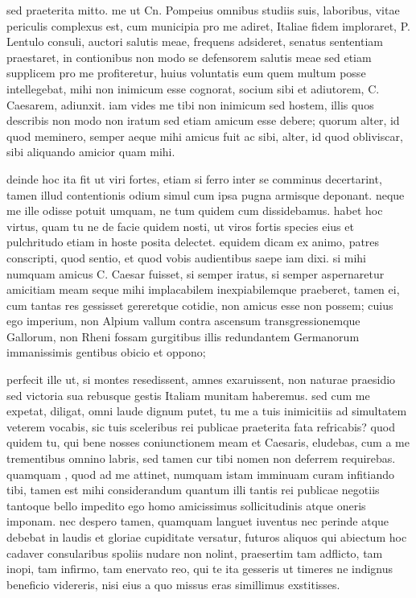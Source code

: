  sed praeterita mitto. me ut Cn. Pompeius omnibus studiis suis, laboribus, vitae periculis complexus est, cum municipia pro me adiret, Italiae fidem imploraret, P. Lentulo consuli, auctori salutis meae, frequens adsideret, senatus sententiam praestaret, in contionibus non modo se defensorem salutis meae sed etiam supplicem pro me profiteretur, huius voluntatis eum quem multum posse intellegebat, mihi non inimicum esse cognorat, socium sibi et adiutorem, C. Caesarem, adiunxit. iam vides me tibi non inimicum sed hostem, illis quos describis non modo non iratum sed etiam amicum esse debere; quorum alter, id quod meminero, semper aeque mihi amicus fuit ac sibi, alter, id quod obliviscar, sibi aliquando amicior quam mihi.

 deinde hoc ita fit ut viri fortes, etiam si ferro inter se comminus decertarint, tamen illud contentionis odium simul cum ipsa pugna armisque deponant. neque me ille odisse potuit umquam, ne tum quidem cum dissidebamus. habet hoc virtus, quam tu ne de facie quidem nosti, ut viros fortis species eius et pulchritudo etiam in hoste posita delectet. equidem dicam ex animo, patres conscripti, quod sentio, et quod vobis audientibus saepe iam dixi. si mihi numquam amicus C. Caesar fuisset, si semper iratus, si semper aspernaretur amicitiam meam seque mihi implacabilem inexpiabilemque praeberet, tamen ei, cum tantas res gessisset gereretque cotidie, non amicus esse non possem; cuius ego imperium, non Alpium vallum contra ascensum transgressionemque Gallorum, non Rheni fossam gurgitibus illis redundantem Germanorum immanissimis gentibus obicio et oppono;

 perfecit ille ut, si montes resedissent, amnes exaruissent, non naturae praesidio sed victoria sua rebusque gestis Italiam munitam haberemus. sed cum me expetat, diligat, omni laude dignum putet, tu me a tuis inimicitiis ad simultatem veterem vocabis, sic tuis sceleribus rei publicae praeterita fata refricabis? quod quidem tu, qui bene nosses coniunctionem meam et Caesaris, eludebas, cum a me trementibus omnino labris, sed tamen cur tibi nomen non deferrem requirebas. quamquam , quod ad me attinet, numquam istam imminuam curam infitiando tibi, tamen est mihi considerandum quantum illi tantis rei publicae negotiis tantoque bello impedito ego homo amicissimus sollicitudinis atque oneris imponam. nec despero tamen, quamquam languet iuventus nec perinde atque debebat in laudis et gloriae cupiditate versatur, futuros aliquos qui abiectum hoc cadaver consularibus spoliis nudare non nolint, praesertim tam adflicto, tam inopi, tam infirmo, tam enervato reo, qui te ita gesseris ut timeres ne indignus beneficio videreris, nisi eius a quo missus eras simillimus exstitisses.

